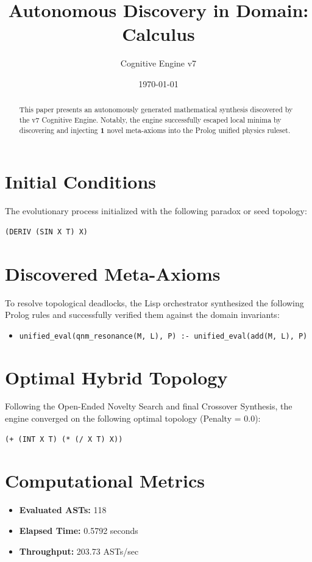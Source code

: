 \documentclass{article}
\title{Autonomous Discovery in Domain: Calculus}
\author{Cognitive Engine v7}
\date{\today}
\begin{document}
\maketitle
\begin{abstract}
This paper presents an autonomously generated mathematical synthesis discovered by the v7 Cognitive Engine. Notably, the engine successfully escaped local minima by discovering and injecting \textbf{1} novel meta-axioms into the Prolog unified physics ruleset.\end{abstract}
\section{Initial Conditions}
The evolutionary process initialized with the following paradox or seed topology:
\begin{verbatim}
(DERIV (SIN X T) X)
\end{verbatim}
\section{Discovered Meta-Axioms}
To resolve topological deadlocks, the Lisp orchestrator synthesized the following Prolog rules and successfully verified them against the domain invariants:
\begin{itemize}
  \item \texttt{unified_eval(qnm_resonance(M, L), P) :- unified_eval(add(M, L), P)}
\end{itemize}
\section{Optimal Hybrid Topology}
Following the Open-Ended Novelty Search and final Crossover Synthesis, the engine converged on the following optimal topology (Penalty = 0.0):
\begin{verbatim}
(+ (INT X T) (* (/ X T) X))
\end{verbatim}
\section{Computational Metrics}
\begin{itemize}
  \item \textbf{Evaluated ASTs:} 118
  \item \textbf{Elapsed Time:} 0.5792 seconds
  \item \textbf{Throughput:} 203.73 ASTs/sec
\end{itemize}
\end{document}
